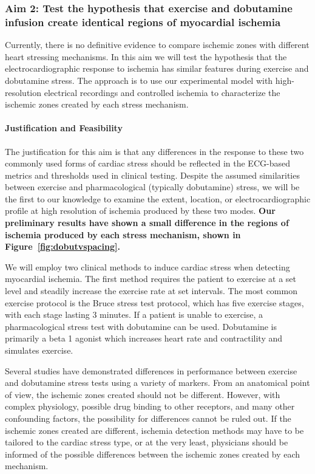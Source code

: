
\subsubsection{Aim 2: Test the hypothesis that exercise and dobutamine infusion create identical regions of myocardial ischemia}

 Currently, there is no definitive evidence to compare ischemic zones with
 different heart stressing mechanisms.
In this aim we will test the
hypothesis that the electrocardiographic response to ischemia has similar
features during exercise and dobutamine stress. The approach is to use our
experimental model
 with high-resolution electrical recordings and
 controlled ischemia
to characterize the ischemic zones created by each
stress mechanism. 

\paragraph{Justification and Feasibility} The justification for this aim
is that any differences in the response to these two commonly used forms of
cardiac stress should be reflected in the ECG-based metrics and thresholds
used in clinical testing.  Despite the assumed similarities between exercise
and pharmacological (typically dobutamine) stress, we will be the first to
our knowledge to examine the extent, location, or electrocardiographic
profile at high resolution of ischemia produced by these two
modes. \textbf{Our preliminary results have shown a small difference in the
  regions of ischemia produced by each stress mechanism, shown in
  Figure~\ref{fig:dobutvspacing}.}

 We will employ two clinical methods
 to induce cardiac stress when detecting myocardial ischemia. The first
 method requires the patient to exercise at a set level and steadily
 increase the exercise rate at set intervals.\cite{BLZ:Oki1986} The most
 common exercise protocol is the Bruce stress test protocol, which has five
 exercise stages, with each stage lasting 3
 minutes.\cite{BLZ:GOL1976,BLZ:Bru1963,BLZ:Oki1986} If a patient is unable
 to exercise, a pharmacological stress test with dobutamine can be
 used.\cite{BLZ:SAL1992,BLZ:Gre1997,BLZ:Man1988} Dobutamine is primarily a
 beta 1 agonist which increases heart rate and contractility and simulates
 exercise. 

Several studies have demonstrated differences in performance between
exercise and dobutamine stress tests using a variety of markers.  From an anatomical point of view, the ischemic
zones created should not be different. However, with complex physiology,
possible drug binding to other receptors, and many other confounding
factors, the possibility for differences cannot be ruled out. If the
ischemic zones created are different, ischemia detection methods may have
to be tailored to the cardiac stress type, or at the very least, physicians
should be informed of the possible differences between the ischemic zones
created by each mechanism.  

